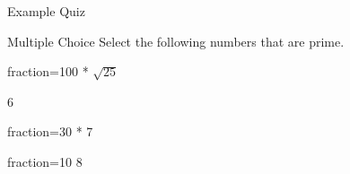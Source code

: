 \documentclass{article}
\begin{document}
\begin{quiz}{Example Quiz}
\begin{multi}[multiple]{Multiple Choice}
Select the following numbers that are prime.
\item[fraction=100]* $\sqrt{25}$
\item 6
\item[fraction=30]* 7
\item[fraction=10] 8
\end{multi}

\end{quiz}
\end{document}
